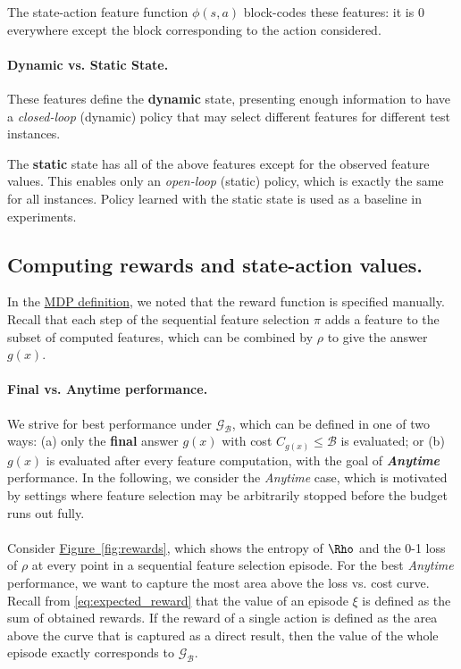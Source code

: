 The state-action feature function $\phi(s, a)$ block-codes these features: it is $0$ everywhere except the block corresponding to the action considered.

\paragraph{Dynamic vs. Static State.}
These features define the \textbf{dynamic} state, presenting enough information to have a \emph{closed-loop} (dynamic) policy that may select different features for different test instances.

The \textbf{static} state has all of the above features except for the observed feature values.
This enables only an \emph{open-loop} (static) policy, which is exactly the same for all instances.
Policy learned with the static state is used as a baseline in experiments.

\subsection{Computing rewards and state-action values.} \label{sec:rewards}
In the \hyperref[def:MDP]{MDP definition}, we noted that the reward function is specified manually.
Recall that each step of the sequential feature selection $\pi$ adds a feature to the subset of computed features, which can be combined by $\rho$ to give the answer $g(x)$.

\paragraph{Final vs. Anytime performance.}
We strive for best performance under $\mathcal{G}_\mathcal{B}$, which can be defined in one of two ways:
(a) only the \textbf{final} answer $g(x)$ with cost $C_{g(x)} \leq \mathcal{B}$ is evaluated;
or (b) $g(x)$ is evaluated after every feature computation, with the goal of \textbf{\emph{Anytime}} performance.
In the following, we consider the \emph{Anytime} case, which is motivated by settings where feature selection may be arbitrarily stopped before the budget runs out fully.

\paragraph{}
Consider \hyperref[fig:rewards]{Figure~\ref*{fig:rewards}}, which shows the entropy of $\Rho$ and the 0-1 loss of $\rho$ at every point in a sequential feature selection episode.
For the best \emph{Anytime} performance, we want to capture the most area above the loss vs. cost curve.
Recall from \eqref{eq:expected_reward} that the value of an episode $\xi$ is defined as the sum of obtained rewards.
If the reward of a single action is defined as the area above the curve that is captured as a direct result, then the value of the whole episode exactly corresponds to $\mathcal{G}_\mathcal{B}$.

